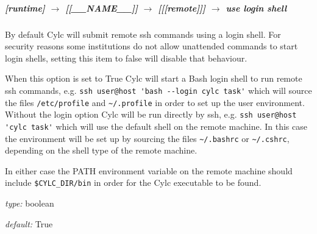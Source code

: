 \subparagraph[ssh messaging]{[runtime] $\rightarrow$ [[\_\_NAME\_\_]] $\rightarrow$ [[[remote]]] $\rightarrow$ use login shell}

By default Cylc will submit remote ssh commands using a login shell. For
security reasons some institutions do not allow unattended commands to start
login shells, setting this item to false will disable that behaviour.

When this option is set to True Cylc will start a Bash login shell to run
remote ssh commands, e.g. \lstinline=ssh user@host 'bash --login cylc task'=
which will source the files \lstinline=/etc/profile= and \lstinline=~/.profile=
in order to set up the user environment. Without the login option Cylc will be
run directly by ssh, e.g. \lstinline=ssh user@host 'cylc task'= which will use
the default shell on the remote machine. In this case the environment will be
set up by sourcing the files \lstinline=~/.bashrc= or \lstinline=~/.cshrc=,
depending on the shell type of the remote machine.

In either case the PATH environment variable on the remote machine should
include \lstinline=$CYLC_DIR/bin= in order for the Cylc executable to be
found.

\begin{myitemize}
\item {\em type:} boolean
\item {\em default:} True
\end{myitemize}

